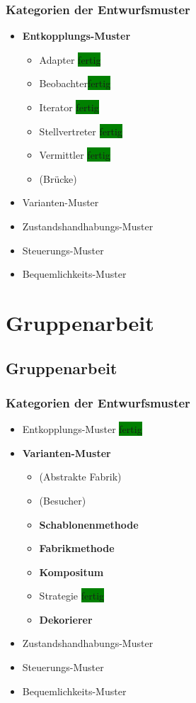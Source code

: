 \documentclass[18pt]{beamer}
\begin{document}
	\begin{frame}
		\frametitle{Kategorien der Entwurfsmuster}
		\begin{itemize}
			\item \textbf{Entkopplungs-Muster}
			\begin{itemize}
				\item Adapter \colorbox{green}{fertig}
				\item Beobachter\colorbox{green}{fertig}
				\item Iterator \colorbox{green}{fertig}
				\item Stellvertreter \colorbox{green}{fertig}
				\item Vermittler \colorbox{green}{fertig}
				\item (Brücke)
			\end{itemize}
			\item Varianten-Muster
			\item Zustandshandhabungs-Muster
			\item Steuerungs-Muster
			\item Bequemlichkeits-Muster
		\end{itemize}
	\end{frame}

\section{Gruppenarbeit}
\subsection{Gruppenarbeit}
	\begin{frame}
		\frametitle{Kategorien der Entwurfsmuster}
		\begin{itemize}
			\item Entkopplungs-Muster \colorbox{green}{fertig}
			\item \textbf{Varianten-Muster}
			\begin{itemize}
				\item (Abstrakte Fabrik)
				\item (Besucher)
				\item \textbf{Schablonenmethode}
				\item \textbf{Fabrikmethode}
				\item \textbf{Kompositum}
				\item Strategie \colorbox{green}{fertig}
				\item \textbf{Dekorierer}
			\end{itemize}
			\item Zustandshandhabungs-Muster
			\item Steuerungs-Muster
			\item Bequemlichkeits-Muster
		\end{itemize}
	\end{frame}
	
\end{document}
